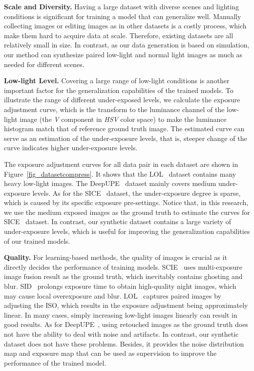 {\bf Scale and Diversity.} Having a large dataset with diverse scenes and lighting conditions is significant for training a model that can generalize well. Manually collecting images or editing images as in other datasets is a costly process, which make them hard to acquire data at scale. Therefore, existing datasets are all relatively small in size. In contrast, as our data generation is based on simulation, our method can  synthesize paired low-light and normal light images as much as needed for different scenes.

{\bf Low-light Level.} Covering a large range of low-light conditions is another important factor for the generalization capabilities of the trained models. To illustrate the range of different under-exposed levels, we calculate the exposure adjustment curve, which is the transform to the luminance channel of the low-light image (the \textit{V} component in \textit{HSV} color space) to make the luminance histogram match that of reference ground truth image. The estimated curve can serve as an estimation of the under-exposure levels, that is, steeper change of the curve indicates higher under-exposure levels.

The exposure adjustment curves for all data pair in each dataset are shown in Figure~\ref{fig_datasetcompress}. It shows that the LOL~\cite{Chen2018Retinex} dataset contains many heavy low-light images. The DeepUPE~\cite{wang2019underexposed} dataset mainly covers medium under-exposure levels. As for the SICE~\cite{Cai2018deep} dataset, the under-exposure degree is sparse, which is caused by its specific exposure pre-settings. Notice that, in this research, we use the medium exposed images as the ground truth to estimate the curves for SICE~\cite{Cai2018deep} dataset. In contrast, our synthetic dataset contains a large variety of under-exposure levels, which is useful for improving the generalization capabilities of our trained models.

{\bf Quality.} For learning-based methods, the quality of images is crucial as it directly decides the performance of training models. SCIE~\cite{Cai2018deep} uses multi-exposure image fusion result as the ground truth, which inevitably contains ghosting and blur. SID~\cite{seedark2018cvpr} prolongs exposure time to obtain high-quality night images, which may cause local overexposure and blur.
LOL~\cite{Chen2018Retinex} captures paired images by adjusting the ISO, which results in the exposure adjustment being approximately linear. In many cases, simply increasing low-light images linearly can result in good results.
As for DeepUPE~\cite{wang2019underexposed}, using retouched images as the ground truth does not have the ability to deal with noise and artifacts.
In contrast, our synthetic dataset does not have these problems. Besides, it provides the noise distribution map and exposure map that can be used as supervision to improve the performance of the trained model.

